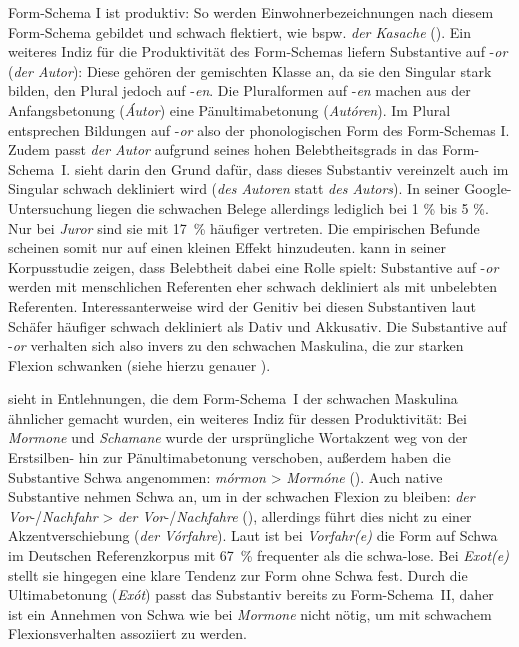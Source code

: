 Form-Schema I ist produktiv: So werden Einwohnerbezeichnungen nach diesem Form-Schema gebildet und schwach flektiert, wie bspw. \textit{der Kasache} (\cite[112]{Kopcke.2000}). Ein weiteres Indiz für die Produktivität des Form-Schemas liefern Substantive auf -\textit{or} (\textit{der Autor}): Diese gehören der gemischten Klasse an, da sie den Singular stark bilden, den Plural jedoch auf -\textit{en}. Die Pluralformen auf -\textit{en} machen aus der Anfangsbetonung (\textit{Áutor}) eine Pänultimabetonung (\textit{Autóren}). Im Plural entsprechen  Bildungen auf -\textit{or} also der phonologischen Form des Form-Schemas I. Zudem passt \textit{der Autor} aufgrund seines hohen Belebtheitsgrads in das Form-Schema~I. \textcite[78]{Kopcke.2005} sieht darin den Grund dafür, dass dieses Substantiv vereinzelt auch im Singular schwach dekliniert wird (\textit{des Autoren} statt \textit{des Autors}). In seiner Google-Untersuchung liegen die schwachen Belege allerdings lediglich bei 1 \% bis 5 \%. Nur bei \textit{Juror} sind sie mit 17~\% häufiger vertreten. Die empirischen Befunde scheinen somit nur auf einen kleinen Effekt hinzudeuten. \textcite[406--407]{Schafer.2019} kann in seiner Korpusstudie zeigen, dass Belebtheit dabei eine Rolle spielt: Substantive auf -\textit{or} werden mit menschlichen Referenten eher schwach dekliniert als mit unbelebten Referenten. Interessanterweise wird der Genitiv bei diesen Substantiven laut Schäfer häufiger schwach dekliniert als Dativ und Akkusativ. Die Substantive auf -\textit{or} verhalten sich also invers zu den schwachen Maskulina, die zur starken Flexion schwanken (siehe hierzu genauer ).   



\textcite[169]{Kopcke.1995} sieht in Entlehnungen, die dem Form-Schema~I der schwachen Maskulina ähnlicher gemacht wurden, ein weiteres Indiz für dessen Produktivität: Bei \textit{Mormone} und \textit{Schamane} wurde der ursprüngliche Wortakzent weg von der Erstsilben- hin zur Pänultimabetonung verschoben, außerdem haben die Substantive Schwa angenommen: \textit{mórmon} > \textit{Mormóne} (\cite[169]{Kopcke.1995}). Auch native Substantive nehmen Schwa an, um in der schwachen Flexion zu bleiben: \textit{der Vor}-/\textit{Nachfahr} > \textit{der} \textit{Vor}-/\textit{Nachfahre} (\cite[137--138]{Kopcke.1993}), allerdings führt dies nicht zu einer Akzentverschiebung (\textit{der Vórfahre}). Laut \textcite[113--115]{Kusova.2014} ist bei \textit{Vorfahr(e)} die Form auf Schwa im Deutschen Referenzkorpus mit 67~\% frequenter als die schwa-lose. Bei \textit{Exot(e)} stellt sie hingegen eine klare Tendenz zur Form ohne Schwa fest. Durch die Ultimabetonung (\textit{Exót}) passt das Substantiv bereits zu Form-Schema~II, daher ist ein Annehmen von Schwa wie bei \textit{Mormone} nicht nötig, um mit schwachem Flexionsverhalten assoziiert zu werden. 


